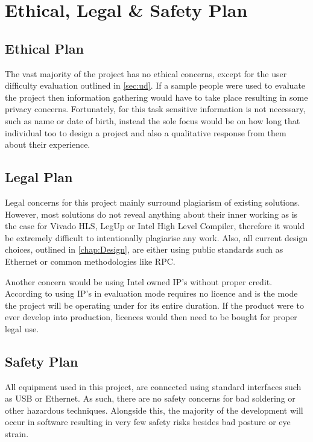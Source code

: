\chapter{Ethical, Legal \& Safety Plan}

\section{Ethical Plan}

The vast majority of the project has no ethical concerns, except for the user difficulty evaluation outlined in \autoref{sec:ud}. If a sample people were used to evaluate the project then information gathering would have to take place resulting in some privacy concerns. Fortunately, for this task sensitive information is not necessary, such as name or date of birth, instead the sole focus would be on how long that individual too to design a project and also a qualitative response from them about their experience. 

\section{Legal Plan}

Legal concerns for this project mainly surround plagiarism of existing solutions. However, most solutions do not reveal anything about their inner working as is the case for Vivado HLS, LegUp or Intel High Level Compiler, therefore it would be extremely difficult to intentionally plagiarise any work. Also, all current design choices, outlined in \autoref{chap:Design}, are either using public standards such as Ethernet or common methodologies like RPC.

Another concern would be using Intel owned IP's without proper credit. According to \cite{intel-license} using IP's in evaluation mode requires no licence and is the mode the project will be operating under for its entire duration. If the product were to ever develop into production, licences would then need to be bought for proper legal use.

\section{Safety Plan}

All equipment used in this project, are connected using standard interfaces such as USB or Ethernet. As such, there are no safety concerns for bad soldering or other hazardous techniques. Alongside this, the majority of the development will occur in software resulting in very few safety risks besides bad posture or eye strain.